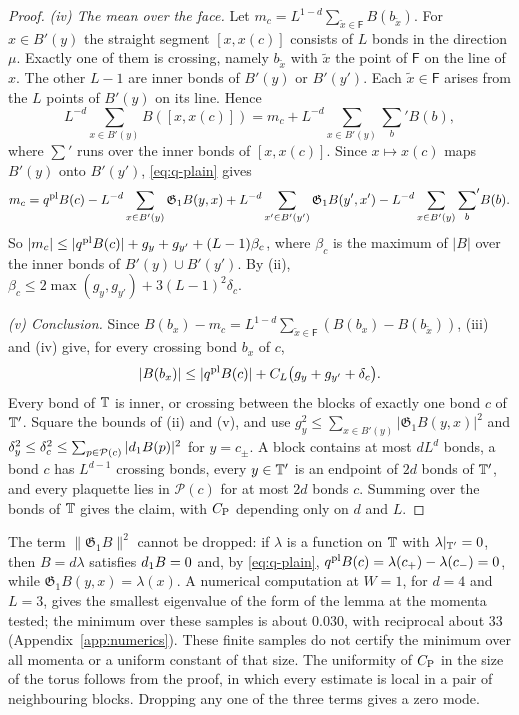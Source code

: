 \begin{proof}
\emph{(iv) The mean over the face.} Let $m_c=L^{1-d}\sum_{\tilde x\in\mathsf F}B(b_{\tilde x})$. For $x\in B'(y)$ the straight segment $[x,x(c)]$ consists of $L$ bonds in the direction $\mu$. Exactly one of them is crossing, namely $b_{\tilde x}$ with $\tilde x$ the point of $\mathsf F$ on the line of $x$. The other $L-1$ are inner bonds of $B'(y)$ or $B'(y')$. Each $\tilde x\in\mathsf F$ arises from the $L$ points of $B'(y)$ on its line. Hence
\[
L^{-d}\sum_{x\in B'(y)}B([x,x(c)])=m_c+L^{-d}\sum_{x\in B'(y)}{\sum_b}'B(b),
\]
where $\sum'$ runs over the inner bonds of $[x,x(c)]$. Since $x\mapsto x(c)$ maps $B'(y)$ onto $B'(y')$, \eqref{eq:q-plain} gives
\[
m_c=q^{\rm pl}B(c)-L^{-d}\sum_{x\in B'(y)}\mathfrak G_1B(y,x)+L^{-d}\sum_{x'\in B'(y')}\mathfrak G_1B(y',x')-L^{-d}\sum_{x\in B'(y)}{\sum_b}'B(b).
\]
So $|m_c|\le|q^{\rm pl}B(c)|+g_y+g_{y'}+(L-1)\beta_c$, where $\beta_c$ is the maximum of $|B|$ over the inner bonds of $B'(y)\cup B'(y')$. By (ii), $\beta_c\le2\max(g_y,g_{y'})+3(L-1)^2\delta_c$.

\emph{(v) Conclusion.} Since $B(b_x)-m_c=L^{1-d}\sum_{\tilde x\in\mathsf F}(B(b_x)-B(b_{\tilde x}))$, (iii) and (iv) give, for every crossing bond $b_x$ of $c$,
\[
|B(b_x)|\le|q^{\rm pl}B(c)|+C_L\big(g_y+g_{y'}+\delta_c\big).
\]
Every bond of $\mathbb T$ is inner, or crossing between the blocks of exactly one bond $c$ of $\mathbb T'$. Square the bounds of (ii) and (v), and use $g_y^2\le\sum_{x\in B'(y)}|\mathfrak G_1B(y,x)|^2$ and $\delta_y^2\le\delta_c^2\le\sum_{p\in\mathcal P(c)}|d_1 B(p)|^2$ for $y=c_\pm$. A block contains at most $dL^d$ bonds, a bond $c$ has $L^{d-1}$ crossing bonds, every $y\in\mathbb T'$ is an endpoint of $2d$ bonds of $\mathbb T'$, and every plaquette lies in $\mathcal P(c)$ for at most $2d$ bonds $c$. Summing over the bonds of $\mathbb T$ gives the claim, with $C_{\rm P}$ depending only on $d$ and $L$.
\end{proof}

The term $\|\mathfrak G_1B\|^2$ cannot be dropped: if $\lambda$ is a function on $\mathbb T$ with $\lambda|_{\mathbb T'}=0$, then $B=d\lambda$ satisfies $d_1 B=0$ and, by \eqref{eq:q-plain}, $q^{\rm pl}B(c)=\lambda(c_+)-\lambda(c_-)=0$, while $\mathfrak G_1B(y,x)=\lambda(x)$. A numerical computation at $W=1$, for $d=4$ and $L=3$, gives the smallest eigenvalue of the form of the lemma at the momenta tested; the minimum over these samples is about $0.030$, with reciprocal about $33$ (Appendix~\ref{app:numerics}). These finite samples do not certify the minimum over all momenta or a uniform constant of that size. The uniformity of $C_{\rm P}$ in the size of the torus follows from the proof, in which every estimate is local in a pair of neighbouring blocks. Dropping any one of the three terms gives a zero mode.

